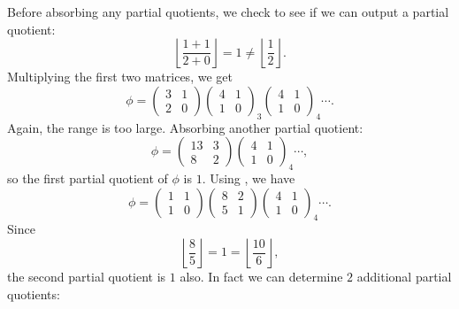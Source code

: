 Before absorbing any partial quotients, we check to see if we can
output a partial quotient:
\[
\left\lfloor \frac{1+1}{2+0} \right\rfloor = 1 \not= 
  \left\lfloor\frac{1}{2}\right\rfloor.
\]
Multiplying the first two matrices, we get
\[
\phi = \begin{pmatrix}3 & 1\\ 2 & 0 \end{pmatrix} 
  \begin{pmatrix}4 & 1 \\ 1 & 0 \end{pmatrix}_3 \begin{pmatrix}4 & 1 \\ 1 & 0 \end{pmatrix}_4 \cdots.
\]
Again, the range is too large.  Absorbing another partial quotient:
\[
\phi = \begin{pmatrix}13 & 3\\ 8 & 2 \end{pmatrix} \begin{pmatrix}4 & 1 \\ 1 & 0 \end{pmatrix}_4
\cdots,
\]
so the first partial quotient of $\phi$ is $1$.  Using
, we have
\[
\phi = \begin{pmatrix}1 & 1\\ 1 & 0 \end{pmatrix} \begin{pmatrix}8 & 2 \\ 5 & 1\end{pmatrix}
   \begin{pmatrix}4 & 1 \\ 1 & 0 \end{pmatrix}_4 \cdots.
\]
Since
\[
\left\lfloor \frac{8}{5} \right\rfloor = 1 
  = \left\lfloor\frac{10}{6}\right\rfloor,
\]
the second partial quotient is $1$ also.  In fact we can determine $2$
additional partial quotients:
